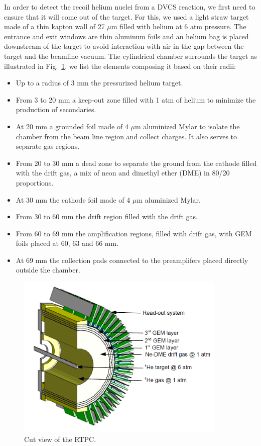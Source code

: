 \documentclass[aps,prc,preprint,superscriptaddress]{revtex4}
\begin{document}
In order to detect the recoil helium nuclei from a DVCS reaction, we first need 
to ensure that it will come out of the target. For this, we used a light straw 
target made of a thin kapton wall of 27 $\mu$m filled with helium at 6 atm 
pressure. The entrance and exit windows are thin aluminum foils and an helium 
bag is placed downstream of the target to avoid interaction with air in the gap 
between the target and the beamline vacuum. The cylindrical 
chamber surrounds the target as illustrated in Fig.~\ref{fig:RTPCGlobal}, we 
list the elements composing it based on their radii:
\begin{itemize}
	\item Up to a radius of 3 mm the pressurized helium target.
	\item From 3 to 20 mm a keep-out zone filled with 1 atm of helium to 
		minimize the production of secondaries. 
	\item At 20 mm a grounded foil made of 4 $\mu$m aluminized Mylar to 
		isolate the chamber from the beam line 
		region and collect charges. It also serves to separate gas regions.
	\item From 20 to 30 mm a dead zone to separate the ground from the cathode
		filled with the drift gas, a mix of neon and dimethyl ether (DME) in 
		80/20 proportions.
	\item At 30 mm the cathode foil made of 4 $\mu$m aluminized Mylar.
	\item From 30 to 60 mm the drift region filled with the drift gas.
	\item From 60 to 69 mm the amplification regions, filled with drift gas, 
		with GEM foils placed at 60, 63 and 66 mm.
	\item At 69 mm the collection pads connected to the preamplifers placed 
		directly outside the chamber.
\end{itemize}

\begin{figure}[tbp!]
\center
\includegraphics[width=10cm]{fig3/RTPC_new_1.png}
\caption{Cut view of the RTPC.}
\label{fig:RTPCGlobal}
\end{figure}
\end{document}

